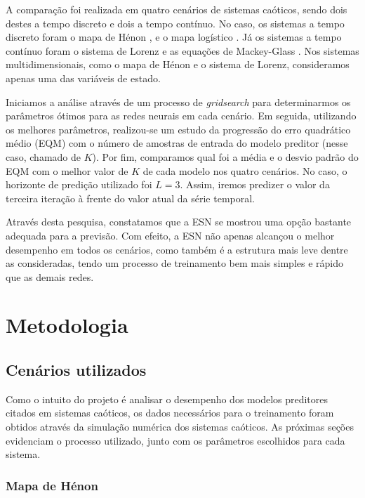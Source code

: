 \documentclass{article}
\begin{document}
A comparação foi realizada em quatro cenários de sistemas caóticos, sendo dois destes a tempo discreto e dois a tempo contínuo. No caso, os sistemas a tempo discreto foram o mapa de Hénon \cite{henon1976two}, e o mapa logístico \cite{may1976simple}. Já os sistemas a tempo contínuo foram o sistema de Lorenz \cite{lorenz1963deterministic} e as equações de Mackey-Glass \cite{mackey1977oscillation}. Nos sistemas multidimensionais, como o mapa de Hénon e o sistema de Lorenz, consideramos apenas uma das variáveis de estado. 

Iniciamos a análise através de um processo de \textit{gridsearch} para determinarmos os parâmetros ótimos para as redes neurais em cada cenário. Em seguida, utilizando os melhores parâmetros, realizou-se um estudo da progressão do erro quadrático médio (EQM) com o número de amostras de entrada do modelo preditor (nesse caso, chamado de $K$). Por fim, comparamos qual foi a média e o desvio padrão do EQM com o melhor valor de $K$ de cada modelo nos quatro cenários. No caso, o horizonte de predição utilizado foi $L=3$. Assim, iremos predizer o valor da terceira iteração à frente do valor atual da série temporal.

Através desta pesquisa, constatamos que a ESN se mostrou uma opção bastante adequada para a previsão. Com efeito, a ESN não apenas alcançou o melhor desempenho em todos os cenários, como também é a estrutura mais leve dentre as consideradas, tendo um processo de treinamento bem mais simples e rápido que as demais redes. 

\section{Metodologia}

\subsection{Cenários utilizados}

Como o intuito do projeto é analisar o desempenho dos modelos preditores citados em sistemas caóticos, os dados necessários para o treinamento foram obtidos através da simulação numérica dos sistemas caóticos. As próximas seções evidenciam o processo utilizado, junto com os parâmetros escolhidos para cada sistema.

\subsubsection{Mapa de Hénon}
\end{document}
